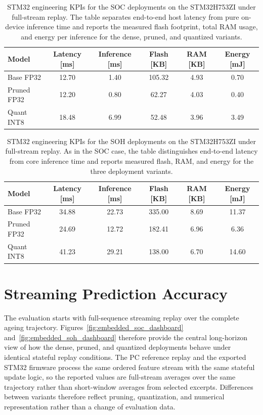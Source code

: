 \documentclass[
    a4paper,
    12pt,
    titlepage,
    bibliography=totoc,
    twoside=on,
    parskip=false,
    numbers=noenddot,
    cleardoublepage=empty,
    DIV=12,
    BCOR=12.0mm,
    headheight=36pt,
    headings=openright
]{scrreprt}
\begin{document}
\begin{table}[H]
    \centering
    \caption[STM32 KPIs for SOC deployments.]{STM32 engineering KPIs for the SOC deployments on the STM32H753ZI under full-stream replay. The table separates end-to-end host latency from pure on-device inference time and reports the measured flash footprint, total RAM usage, and energy per inference for the dense, pruned, and quantized variants.}
    \label{tab:embedded_soc_kpi}
    \begin{tabular}{@{}lccccc@{}}
        \toprule
        Model & Latency [ms] & Inference [ms] & Flash [KB] & RAM [KB] & Energy [mJ] \\
        \midrule
        Base FP32 & 12.70 & 1.40 & 105.32 & 4.93 & 0.70 \\
        Pruned FP32 & 12.20 & 0.80 & 62.27 & 4.03 & 0.40 \\
        Quant INT8 & 18.48 & 6.99 & 52.48 & 3.96 & 3.49 \\
        \bottomrule
    \end{tabular}
\end{table}

\begin{table}[H]
    \centering
    \caption[STM32 KPIs for SOH deployments.]{STM32 engineering KPIs for the SOH deployments on the STM32H753ZI under full-stream replay. As in the SOC case, the table distinguishes end-to-end latency from core inference time and reports measured flash, RAM, and energy for the three deployment variants.}
    \label{tab:embedded_soh_kpi}
    \begin{tabular}{@{}lccccc@{}}
        \toprule
        Model & Latency [ms] & Inference [ms] & Flash [KB] & RAM [KB] & Energy [mJ] \\
        \midrule
        Base FP32 & 34.88 & 22.73 & 335.00 & 8.69 & 11.37 \\
        Pruned FP32 & 24.69 & 12.72 & 182.41 & 6.96 & 6.36 \\
        Quant INT8 & 41.23 & 29.21 & 138.00 & 6.70 & 14.60 \\
        \bottomrule
    \end{tabular}
\end{table}

\section{Streaming Prediction Accuracy}
The evaluation starts with full-sequence streaming replay over the complete ageing trajectory. Figures~\ref{fig:embedded_soc_dashboard} and~\ref{fig:embedded_soh_dashboard} therefore provide the central long-horizon view of how the dense, pruned, and quantized deployments behave under identical stateful replay conditions. The PC reference replay and the exported STM32 firmware process the same ordered feature stream with the same stateful update logic, so the reported values are full-stream averages over the same trajectory rather than short-window averages from selected excerpts. Differences between variants therefore reflect pruning, quantization, and numerical representation rather than a change of evaluation data.
\end{document}
